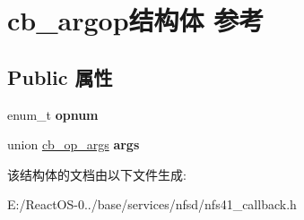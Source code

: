 \hypertarget{structcb__argop}{}\section{cb\+\_\+argop结构体 参考}
\label{structcb__argop}
\subsection*{Public 属性}
\begin{DoxyCompactItemize}
\item 
\mbox{\label{structcb__argop_a6140bb403a7ec867eaf8a4d8e9530dd4}} 
enum\+\_\+t {\bfseries opnum}
\item 
\mbox{\label{structcb__argop_a7d0a354557472c54544952058b289fbf}} 
union \hyperlink{unioncb__op__args}{cb\+\_\+op\+\_\+args} {\bfseries args}
\end{DoxyCompactItemize}


该结构体的文档由以下文件生成\+:\begin{DoxyCompactItemize}
\item 
E\+:/\+React\+O\+S-\/0../base/services/nfsd/nfs41\+\_\+callback.\+h\end{DoxyCompactItemize}
